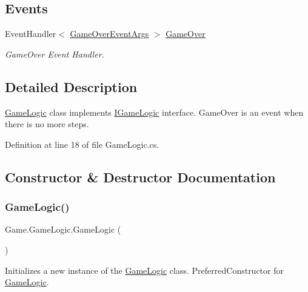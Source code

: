 \subsection*{Events}
\begin{DoxyCompactItemize}
\item 
Event\+Handler$<$ \mbox{\hyperlink{class_game_1_1_game_over_event_args}{Game\+Over\+Event\+Args}} $>$ \mbox{\hyperlink{class_game_1_1_game_logic_a8a784b2845447428fe14f9e57ae9c2bf}{Game\+Over}}
\begin{DoxyCompactList}\small\item\em Game\+Over Event Handler. \end{DoxyCompactList}\end{DoxyCompactItemize}


\subsection{Detailed Description}
\mbox{\hyperlink{class_game_1_1_game_logic}{Game\+Logic}} class implements \mbox{\hyperlink{interface_game_1_1_i_game_logic}{I\+Game\+Logic}} interface. Game\+Over is an event when there is no more steps. 



Definition at line 18 of file Game\+Logic.\+cs.



\subsection{Constructor \& Destructor Documentation}
\mbox{\label{class_game_1_1_game_logic_a0684364f86fc5890d2b722e226c93f1f}} 
\subsubsection{\texorpdfstring{GameLogic()}{GameLogic()}\hspace{0.1cm}{\footnotesize\ttfamily [1/2]}}
{\footnotesize\ttfamily Game.\+Game\+Logic.\+Game\+Logic (\begin{DoxyParamCaption}{ }\end{DoxyParamCaption})}



Initializes a new instance of the \mbox{\hyperlink{class_game_1_1_game_logic}{Game\+Logic}} class. Preferred\+Constructor for \mbox{\hyperlink{class_game_1_1_game_logic}{Game\+Logic}}. 



